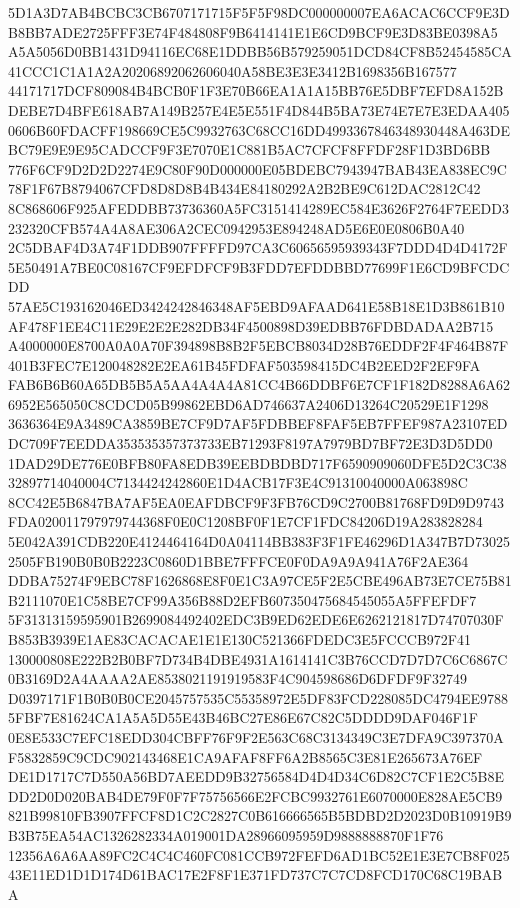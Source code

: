 \documentclass[UTF8,fontset=fandol,zihao=-4,a4paper]{ctexart}
\begin{document}
{{5D1A3D7AB4BCBC3CB6707171715F5F5F98DC000000007EA6ACAC6CCF9E3DB8BB7ADE2725FFF3E74F484808F9B6414141E1E6CD9BCF9E3D83BE0398A5
A5A5056D0BB1431D94116EC68E1DDBB56B579259051DCD84CF8B52454585CA41CCC1C1A1A2A20206892062606040A58BE3E3E3412B1698356B167577
44171717DCF809084B4BCB0F1F3E70B66EA1A1A15BB76E5DBF7EFD8A152BDEBE7D4BFE618AB7A149B257E4E5E551F4D844B5BA73E74E7E7E3EDAA405
0606B60FDACFF198669CE5C9932763C68CC16DD4993367846348930448A463DEBC79E9E9E95CADCCF9F3E7070E1C881B5AC7CFCF8FFDF28F1D3BD6BB
776F6CF9D2D2D2274E9C80F90D000000E05BDEBC7943947BAB43EA838EC9C78F1F67B8794067CFD8D8D8B4B434E84180292A2B2BE9C612DAC2812C42
8C868606F925AFEDDBB73736360A5FC3151414289EC584E3626F2764F7EEDD3232320CFB574A4A8AE306A2CEC0942953E894248AD5E6E0E0806B0A40
2C5DBAF4D3A74F1DDB907FFFFD97CA3C60656595939343F7DDD4D4D4172F5E50491A7BE0C08167CF9EFDFCF9B3FDD7EFDDBBD77699F1E6CD9BFCDCDD
57AE5C193162046ED3424242846348AF5EBD9AFAAD641E58B18E1D3B861B10AF478F1EE4C11E29E2E2E282DB34F4500898D39EDBB76FDBDADAA2B715
A4000000E8700A0A0A70F394898B8B2F5EBCB8034D28B76EDDF2F4F464B87F401B3FEC7E120048282E2EA61B45FDFAF503598415DC4B2EED2F2EF9FA
FAB6B6B60A65DB5B5A5AA4A4A4A81CC4B66DDBF6E7CF1F182D8288A6A626952E565050C8CDCD05B99862EBD6AD746637A2406D13264C20529E1F1298
3636364E9A3489CA3859BE7CF9D7AF5FDBBEF8FAF5EB7FFEF987A23107EDDC709F7EEDDA353535357373733EB71293F8197A7979BD7BF72E3D3D5DD0
1DAD29DE776E0BFB80FA8EDB39EEBDBDBD717F6590909060DFE5D2C3C3832897714040004C7134424242860E1D4ACB17F3E4C91310040000A063898C
8CC42E5B6847BA7AF5EA0EAFDBCF9F3FB76CD9C2700B81768FD9D9D9743FDA020011797979744368F0E0C1208BF0F1E7CF1FDC84206D19A283828284
5E042A391CDB220E4124464164D0A04114BB383F3F1FE46296D1A347B7D730252505FB190B0B0B2223C0860D1BBE7FFFCE0F0DA9A9A941A76F2AE364
DDBA75274F9EBC78F1626868E8F0E1C3A97CE5F2E5CBE496AB73E7CE75B81B2111070E1C58BE7CF99A356B88D2EFB607350475684545055A5FFEFDF7
5F31313159595901B2699084492402EDC3B9ED62EDE6E6262121817D74707030FB853B3939E1AE83CACACAE1E1E130C521366FDEDC3E5FCCCB972F41
130000808E222B2B0BF7D734B4DBE4931A1614141C3B76CCD7D7D7C6C6867C0B3169D2A4AAAA2AE8538021191919583F4C904598686D6DFDF9F32749
D0397171F1B0B0B0CE2045757535C55358972E5DF83FCD228085DC4794EE97885FBF7E81624CA1A5A5D55E43B46BC27E86E67C82C5DDDD9DAF046F1F
0E8E533C7EFC18EDD304CBFF76F9F2E563C68C3134349C3E7DFA9C397370AF5832859C9CDC902143468E1CA9AFAF8FF6A2B8565C3E81E265673A76EF
DE1D1717C7D550A56BD7AEEDD9B32756584D4D4D34C6D82C7CF1E2C5B8EDD2D0D020BAB4DE79F0F7F75756566E2FCBC9932761E6070000E828AE5CB9
821B99810FB3907FFCF8D1C2C2827C0B616666565B5BDBD2D2023D0B10919B9B3B75EA54AC1326282334A019001DA28966095959D9888888870F1F76
12356A6A6AA89FC2C4C4C460FC081CCB972FEFD6AD1BC52E1E3E7CB8F02543E11ED1D1D174D61BAC17E2F8F1E371FD737C7C7CD8FCD170C68C19BABA
}}
\end{document}
